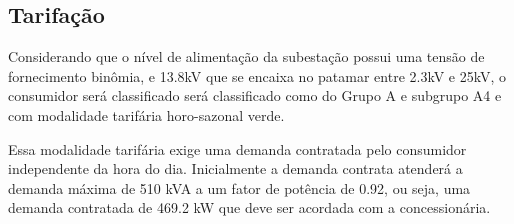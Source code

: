 \subsection{Tarifação}

Considerando que o nível de alimentação da subestação possui uma tensão de fornecimento binômia, e 13.8kV que se encaixa no patamar entre 2.3kV e 25kV, o consumidor será classificado será classificado como do Grupo A e subgrupo A4 e com modalidade tarifária horo-sazonal verde.

Essa modalidade tarifária exige uma demanda contratada pelo consumidor independente da hora do dia. Inicialmente a demanda contrata atenderá a demanda máxima de 510 kVA a um fator de potência de 0.92, ou seja, uma demanda contratada de 469.2 kW que deve ser acordada com a concessionária.


